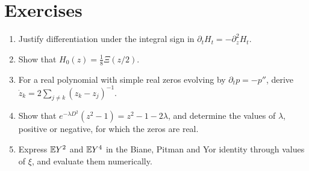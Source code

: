 \section*{Exercises}
\begin{enumerate}
\item Justify differentiation under the integral sign in $\partial_tH_t = -\partial_z^2H_t$.
\item Show that $H_0(z) = \frac18\Xi(z/2)$.
\item For a real polynomial with simple real zeros evolving by $\partial_tp = -p''$, derive $\dot z_k = 2\sum_{j\neq k}(z_k-z_j)^{-1}$.
\item Show that $e^{-\lambda D^2}(z^2-1) = z^2-1-2\lambda$, and determine the values of $\lambda$, positive or negative, for which the zeros are real.
\item Express $\mathbb{E} Y^2$ and $\mathbb{E} Y^4$ in the Biane, Pitman and Yor identity through values of $\xi$, and evaluate them numerically.
\end{enumerate}

